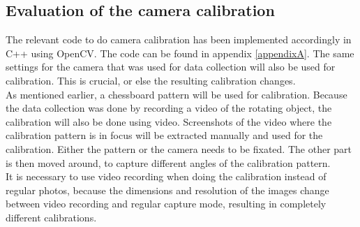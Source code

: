 \subsection{Evaluation of the camera calibration} \label{tests:cameracalib}
The relevant code to do camera calibration has been implemented accordingly in C++ using OpenCV. The code can be found in appendix \ref{appendixA}. The same settings for the camera that was used for data collection will also be used for calibration. This is crucial, or else the resulting calibration changes.\\ 

As mentioned earlier, a chessboard pattern will be used for calibration. Because the data collection was done by recording a video of the rotating object, the calibration will also be done using video. Screenshots of the video where the calibration pattern is in focus will be extracted manually and used for the calibration. Either the pattern or the camera needs to be fixated. The other part is then moved around, to capture different angles of the calibration pattern.\\ 

It is necessary to use video recording when doing the calibration instead of regular photos, because the dimensions and resolution of the images change between video recording and regular capture mode, resulting in completely different calibrations.\\

